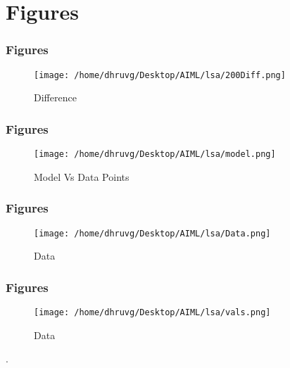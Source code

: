 \documentclass{beamer}
\begin{document}
 
\section{Figures}

\begin{frame}
\frametitle{Figures}
\begin{figure}[H]
    \texttt{[image: /home/dhruvg/Desktop/AIML/lsa/200Diff.png]}
    \caption{Difference}
    \label{A3}
\end{figure}
\end{frame}
 
\begin{frame}
\frametitle{Figures}
\begin{figure}[H]
    \texttt{[image: /home/dhruvg/Desktop/AIML/lsa/model.png]}
    \caption{Model Vs Data Points}
    \label{A3}
\end{figure}
\end{frame}

\begin{frame}
\frametitle{Figures}
\begin{figure}[H]
    \texttt{[image: /home/dhruvg/Desktop/AIML/lsa/Data.png]}
    \caption{Data}
    \label{A3}
\end{figure}
\end{frame}

\begin{frame}
\frametitle{Figures}
\begin{figure}[H]
    \texttt{[image: /home/dhruvg/Desktop/AIML/lsa/vals.png]}
    \caption{Data}
    \label{A3}
\end{figure}
\end{frame}

\begin{frame}
\Huge{\centerline{.}}
\end{frame}
\end{document}
